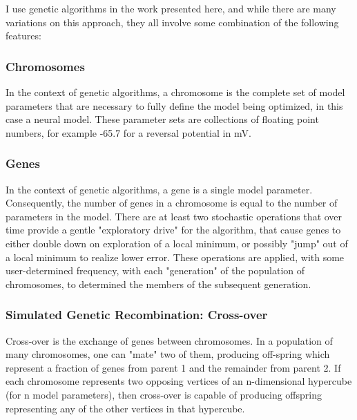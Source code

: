 I use genetic algorithms in the work presented here, and while there are many variations on this approach, they all involve some combination of the following features:
\subsubsection{Chromosomes}
In the context of genetic algorithms, a chromosome is the complete set of model parameters that are necessary to fully define the model being optimized, in this case a neural model.
These parameter sets are collections of floating point numbers, for example -65.7 for a reversal potential in mV.
\subsubsection{Genes}
In the context of genetic algorithms, a gene is a single model parameter.  Consequently, the number of genes in a chromosome is equal to the number of parameters in the model.
There are at least two stochastic operations that over time provide a gentle "exploratory drive" for the algorithm, that cause genes to either double down on exploration of a local minimum, or possibly "jump" out of a local minimum to realize lower error.  These operations are applied, with some user-determined frequency, with each "generation" of the population of chromosomes, to determined the members of the subsequent generation.
\subsubsection{Simulated Genetic Recombination: Cross-over}
Cross-over is the exchange of genes between chromosomes.  In a population of many chromosomes, one can "mate" two of them, producing off-spring which represent a fraction of genes from parent 1 and the remainder from parent 2.  If each chromosome represents two opposing vertices of an n-dimensional hypercube (for n model parameters), then cross-over is capable of producing offspring representing any of the other vertices in that hypercube.
